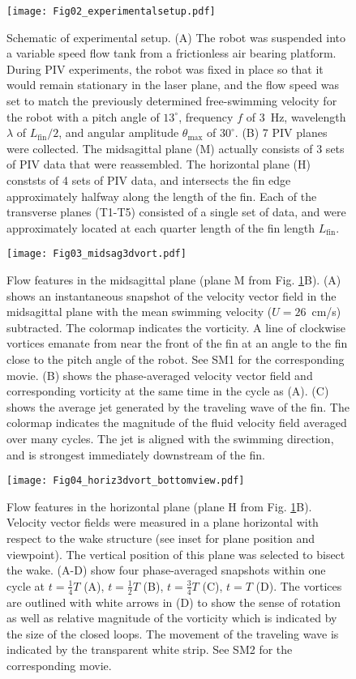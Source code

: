 \documentclass[onecolumn]{IEEEtran}
\begin{document}
\begin{figure}
\centering
\texttt{[image: Fig02\_experimentalsetup.pdf]}
\caption{Schematic of experimental setup. 
(A) The robot was suspended into a variable speed flow tank from a
frictionless air bearing platform. During PIV experiments, the robot was
fixed in place so that it would remain stationary in the laser plane, and
the flow speed was set to match the previously determined free-swimming
velocity for the robot with a pitch angle of $13^\circ$, frequency $f$ of
3~Hz, wavelength $\lambda$ of $L_\text{fin}/2$, and angular amplitude $\theta_\text{max}$
of $30^\circ$. 
(B) 7 PIV planes were collected. The midsagittal plane (M)
actually consists of 3 sets of PIV data that were reassembled. The
horizontal plane (H) conststs of 4 sets of PIV data, and intersects the
fin edge approximately halfway along the length of the fin. Each of the transverse
planes (T1-T5) consisted of a single set of data, and were
approximately located at each quarter length of the fin length $L_\text{fin}$.}
\label{fig:exp_setup}
\end{figure}
\clearpage
\newpage

\begin{figure}
\centering
\texttt{[image: Fig03\_midsag3dvort.pdf]}
\caption{Flow features in the midsagittal plane (plane M from Fig. \ref{fig:exp_setup}B). 
(A) shows an instantaneous snapshot of the velocity vector field in the
midsagittal plane with the mean swimming velocity ($U = 26$~cm/s) 
subtracted. The colormap indicates the vorticity. A line of
clockwise vortices emanate from near the front of the fin at an angle to
the fin close to the pitch angle of the robot. See SM1 for the corresponding movie.
(B) shows the phase-averaged velocity vector field and corresponding vorticity at the same time in the cycle as (A).
(C) shows the average jet
generated by the traveling wave of the fin. The colormap indicates the
magnitude of the fluid velocity field averaged over many cycles. The jet
is aligned with the swimming direction, and is strongest immediately
downstream of the fin.}
\label{fig:midsag}
\end{figure}
\clearpage
\newpage

\begin{figure}
\centering
\texttt{[image: Fig04\_horiz3dvort\_bottomview.pdf]}
\caption{Flow features in the horizontal plane (plane H from Fig. \ref{fig:exp_setup}B). 
Velocity vector fields were measured in a plane horizontal with respect to
the wake structure (see inset for plane position and viewpoint). The vertical position
of this plane was selected to bisect the wake. (A-D) show four phase-averaged snapshots
within one cycle at $t = \frac{1}{4}T$ (A), $t = \frac{1}{2} T$ (B), $t =
\frac{3}{4}T$ (C), $t = T$ (D).  The vortices are outlined with 
white arrows in (D) to show the sense of rotation as well as 
relative magnitude of the vorticity which is indicated by the size of the closed loops.  
The movement of the traveling wave is indicated by the transparent white strip.  
See SM2 for the corresponding movie.}
\label{fig:horiz}
\end{figure}
\clearpage
\newpage
\end{document}
